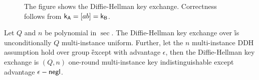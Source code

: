 \begin{figure}[h!]
\centering
{}
\label{fig:DH}
\caption{The figure shows the Diffie-Hellman key exchange. Correctness follows from $\mathsf{k}_\mathsf{A}=[ab]=\mathsf{k}_{\mathsf{B}}$.}
\end{figure}

\begin{lemma}\label{lem:DDH}
Let $Q$ and $n$ be polynomial in $\sec$.
The Diffie-Hellman key exchange over \G is unconditionally $Q$ multi-instance uniform. Further, let the $n$ multi-instance DDH assumption hold over group \G except with advantage $\epsilon$, then the Diffie-Hellman key exchange is $(Q,n)$ one-round multi-instance key indistinguishable except advantage $\epsilon-\mathsf{negl}$. 
\end{lemma}

